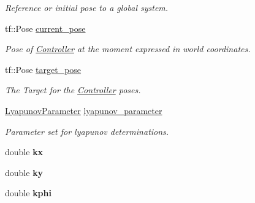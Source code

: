 \begin{DoxyCompactItemize}
\begin{DoxyCompactList}\small\item\em Reference or initial pose to a global system. \end{DoxyCompactList}\item 
tf\+::\+Pose \hyperlink{classController_a9575ed78c8b37c15f425deb48a3fe413}{current\+\_\+pose}\hypertarget{classController_a9575ed78c8b37c15f425deb48a3fe413}{}\label{classController_a9575ed78c8b37c15f425deb48a3fe413}

\begin{DoxyCompactList}\small\item\em Pose of \hyperlink{classController}{Controller} at the moment expressed in world coordinates. \end{DoxyCompactList}\item 
tf\+::\+Pose \hyperlink{classController_aa27e5e790f798a9dd55078b24a326dd6}{target\+\_\+pose}\hypertarget{classController_aa27e5e790f798a9dd55078b24a326dd6}{}\label{classController_aa27e5e790f798a9dd55078b24a326dd6}

\begin{DoxyCompactList}\small\item\em The Target for the \hyperlink{classController}{Controller} poses. \end{DoxyCompactList}\item 
\hyperlink{structController_1_1LyapunovParameter}{Lyapunov\+Parameter} \hyperlink{classController_a8069db2319ff64d65607b1aa897d3069}{lyapunov\+\_\+parameter}\hypertarget{classController_a8069db2319ff64d65607b1aa897d3069}{}\label{classController_a8069db2319ff64d65607b1aa897d3069}

\begin{DoxyCompactList}\small\item\em Parameter set for lyapunov determinations. \end{DoxyCompactList}\item 
double {\bfseries kx}\hypertarget{classController_a18cb9e47664e29810d99a17a3997fd79}{}\label{classController_a18cb9e47664e29810d99a17a3997fd79}

\item 
double {\bfseries ky}\hypertarget{classController_a75a14de3b905db8fc247c2264e55f90b}{}\label{classController_a75a14de3b905db8fc247c2264e55f90b}

\item 
double {\bfseries kphi}\hypertarget{classController_acf8a5d288ffb3537a7aa00745bd5a7b3}{}\label{classController_acf8a5d288ffb3537a7aa00745bd5a7b3}


\end{DoxyCompactItemize}
